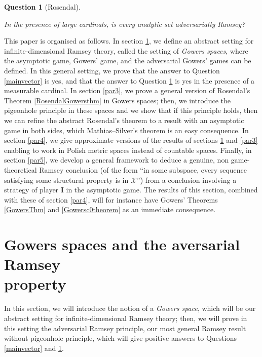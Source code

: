 \documentclass[a4paper,11pt]{article}
\newtheorem{question}[thm]{Question}
\theoremstyle{definition}
\numberwithin{equation}{section}
\newcommand{\X}{\mathcal{X}}
\newcommand{\I}{\textbf{I}}
\begin{document}
\begin{question}[Rosendal]\label{mainvectoranalytic}

In the presence of large cardinals, is every analytic set adversarially Ramsey?

\end{question}

This paper is organised as follows. In section \ref{par2}, we define an abstract setting for infinite-dimensional Ramsey theory, called the setting of \emph{Gowers spaces}, where the asymptotic game, Gowers' game, and the adversarial Gowers' games can be defined. In this general setting, we prove that the answer to Question \ref{mainvector} is yes, and that the answer to Question \ref{mainvectoranalytic} is yes in the presence of a measurable cardinal. In section \ref{par3}, we prove a general version of Rosendal's Theorem \ref{RosendalGowersthm} in Gowers spaces; then, we introduce the pigeonhole principle in these spaces and we show that if this principle holds, then we can refine the abstract Rosendal's theorem to a result with an asymptotic game in both sides, which Mathias--Silver's theorem is an easy consequence. In section \ref{par4}, we give approximate versions of the results of sections \ref{par2} and \ref{par3} enabling to work in Polish metric spaces instead of countable spaces. Finally, in section \ref{par5}, we develop a general framework to deduce a genuine, non game-theoretical Ramsey conclusion (of the form ``in some subspace, every sequence satisfying some structural property is in $\X$'') from a conclusion involving a strategy of player \I{} in the asymptotic game. The results of this section, combined with these of section \ref{par4}, will for instance have Gowers' Theorems \ref{GowersThm} and \ref{Gowersc0theorem} as an immediate consequence.









\bigskip\bigskip

\section{Gowers spaces and the aversarial Ramsey\\property}\label{par2}

In this section, we will introduce the notion of a \emph{Gowers space}, which will be our abstract setting for infinite-dimensional Ramsey theory; then, we will prove in this setting the adversarial Ramsey principle, our most general Ramsey result without pigeonhole principle, which will give positive answers to Questions \ref{mainvector} and \ref{mainvectoranalytic}.
\end{document}
